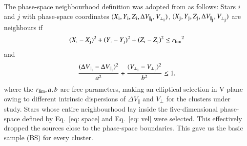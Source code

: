\documentclass{aa}
\begin{document}
The phase-space neighbourhood definition was adopted from  as follows: Stars $i$ and $j$ with phase-space coordinates $(X\textsubscript{i},Y\textsubscript{i},Z\textsubscript{i},\Delta V_{\parallel\textsubscript{i}},  V_{\perp\textsubscript{i}})$, $(X\textsubscript{j},Y\textsubscript{j},Z\textsubscript{j},\Delta V_{\parallel\textsubscript{j}},  V_{\perp\textsubscript{j}})$ are neighbours if
\begin{equation}\label{eq: space}
(X\textsubscript{i} - X\textsubscript{j})^2 + (Y\textsubscript{i} - Y\textsubscript{j})^2 + (Z\textsubscript{i} - Z\textsubscript{j})^2 \leq r\textsubscript{lim}^2 
\end{equation}
and
\begin{equation}\label{eq: vel}
\frac{(\Delta V_{\parallel\textsubscript{i}} - \Delta V_{\parallel\textsubscript{j}})^2}{a^2}  + \frac{(V_{\perp\textsubscript{i}} - V_{\perp\textsubscript{j}})^2}{b^2} \leq 1,
\end{equation}
where the $r\textsubscript{lim}, a, b$ are free parameters, making an elliptical selection in V-plane owing to different intrinsic dispersions of $\Delta V_{\parallel}$ and $ V_{\perp}$ for the clusters under study. Stars whose entire neighbourhood lay inside the five-dimensional phase-space defined by Eq.~\ref{eq: space} and Eq.~\ref{eq: vel} were selected. This effectively dropped the sources close to the phase-space boundaries. This gave us the basic sample (BS) for every cluster.
\end{document}
